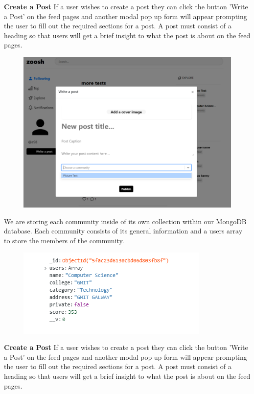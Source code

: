 \textbf{Create a Post}
\newline
If a user wishes to create a post they can click the button 'Write a Post' on the feed pages and another modal pop up form will appear prompting the user to fill out the required sections for a post. A post must consist of a heading so that users will get a brief insight to what the post is about on the feed pages. 

\begin{figure}[H]
  \centering
  \includegraphics[scale=0.35]{img/createpost.PNG}
  \label{fig:Create Post Modal.}
\end{figure}

We are storing each community inside of its own collection within our MongoDB database. Each community consists of its general information and a users array to store the members of the community.

\begin{figure}[H]
  \centering
  \includegraphics[scale=0.85]{img/SocsCollection.PNG}
  \label{fig:Communities Collection - MongoDB.}
\end{figure}

\newpage
\textbf{Create a Post}
\newline
If a user wishes to create a post they can click the button 'Write a Post' on the feed pages and another modal pop up form will appear prompting the user to fill out the required sections for a post. A post must consist of a heading so that users will get a brief insight to what the post is about on the feed pages. 

